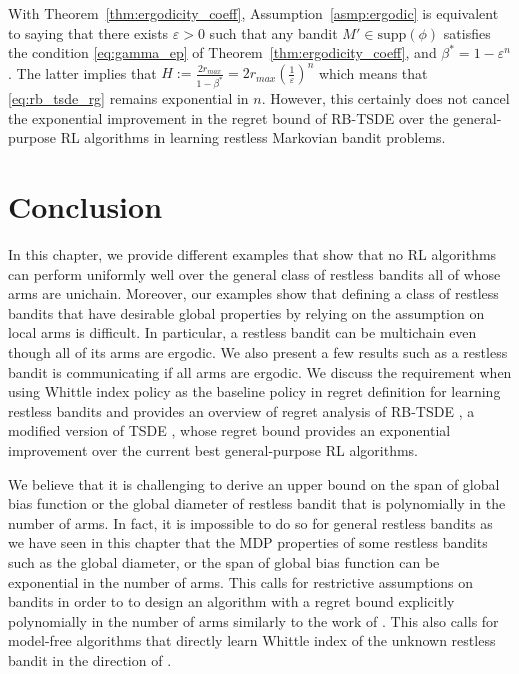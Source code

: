 With Theorem~\ref{thm:ergodicity_coeff}, Assumption~\ref{asmp:ergodic} is equivalent to saying that there exists $\varepsilon>0$ such that any bandit $M'\in\mathrm{supp}(\phi)$ satisfies the condition \eqref{eq:gamma_ep} of Theorem~\ref{thm:ergodicity_coeff}, and $\beta^*=1-\varepsilon^n$.
The latter implies that $H:=\displaystyle\frac{2r_{max}}{1-\beta^*}=\displaystyle2r_{max}\left(\frac{1}{\varepsilon}\right)^n$ which means that \eqref{eq:rb_tsde_rg} remains exponential in $n$.
However, this certainly does not cancel the exponential improvement in the regret bound of RB-TSDE \cite{akbarzadeh2022learning} over the general-purpose RL algorithms in learning restless Markovian bandit problems.

\section{Conclusion}
\label{ch:restless:sec:conclude}

In this chapter, we provide different examples that show that no RL algorithms can perform uniformly well over the general class of restless bandits all of whose arms are unichain. Moreover, our examples show that defining a class of restless bandits that have desirable global properties by relying on the assumption on local arms is difficult.
In particular, a restless bandit can be multichain even though all of its arms are ergodic.
We also present a few results such as a restless bandit is communicating if all arms are ergodic.
We discuss the requirement when using Whittle index policy as the baseline policy in regret definition for learning restless bandits and provides an overview of regret analysis of RB-TSDE \cite{akbarzadeh2022learning}, a modified version of TSDE \cite{ouyang2017learning}, whose regret bound provides an exponential improvement over the current best general-purpose RL algorithms.

We believe that it is challenging to derive an upper bound on the span of global bias function or the global diameter of restless bandit that is polynomially in the number of arms.
In fact, it is impossible to do so for general restless bandits as we have seen in this chapter that the MDP properties of some restless bandits such as the global diameter, or the span of global bias function can be exponential in the number of arms.
This calls for restrictive assumptions on bandits in order to to design an algorithm with a regret bound explicitly polynomially in the number of arms similarly to the work of \cite{wang2020restless}.
This also calls for model-free algorithms that directly learn Whittle index of the unknown restless bandit in the direction of \cite{fu2019towards, gibson2021novel, nakhleh2021neurwin, avrachenkov2022whittle}.

